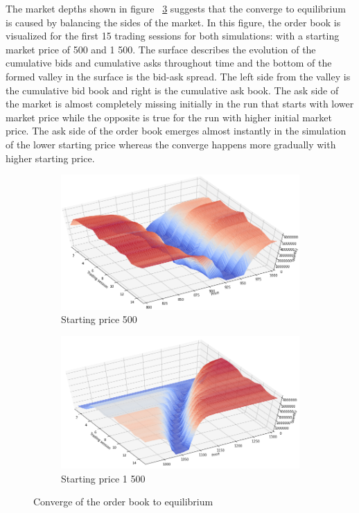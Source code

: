 The market depths shown in figure ~\ref{fig:market_depths} suggests that the
converge to equilibrium is caused by balancing the sides of the market. 
In this figure, the order book is visualized for the first 15 trading sessions
for both simulations: with a starting market price of 500 and 1 500. 
The surface describes the evolution of the cumulative bids and cumulative asks 
throughout time and the bottom of the formed valley in the surface is the bid-ask spread. 
The left side from the valley is the cumulative bid book and right is the cumulative ask book. 
The ask side of the market is almost completely missing initially in the run that
starts with lower market price while the opposite is true for the run with higher
initial market price. The ask side of the order book emerges almost instantly 
in the simulation of the lower starting price whereas the converge happens more 
gradually with higher starting price.


\begin{figure}
    \centering
    \begin{subfigure}{.5\textwidth}
      \centering
      \includegraphics[width=\linewidth]{plots/basic_market_depth_converge_lower.png}
      \caption{Starting price 500}
      \label{fig:market_depth_lower}
    \end{subfigure}%
    \begin{subfigure}{.5\textwidth}
      \centering
      \includegraphics[width=\linewidth]{plots/basic_market_depth_converge_higher.png}
      \caption{Starting price 1 500}
      \label{fig:market_depth_higher}
    \end{subfigure}
    \caption{Converge of the order book to equilibrium}
    \label{fig:market_depths}
\end{figure}

